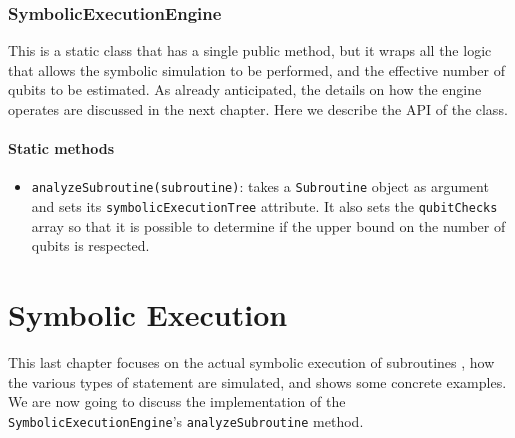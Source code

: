 \documentclass[12pt,a4paper]{report}
\theoremstyle{definition}
\theoremstyle{definition}
\theoremstyle{definition}
\begin{document}
\subsection{SymbolicExecutionEngine}
This is a static class that has a single public method, but it wraps all the logic that allows the symbolic simulation to be performed, and the effective number of qubits to be estimated. As already anticipated, the details on how the engine operates are discussed in the next chapter. Here we describe the API of the class.
\subsubsection{Static methods}
\begin{itemize}
    \itemsep 0em
    \item \texttt{analyzeSubroutine(subroutine)}: takes a \texttt{Subroutine} object as argument and sets its \texttt{symbolicExecutionTree} attribute. It also sets the \texttt{qubitChecks} array so that it is possible to determine if the upper bound on the number of qubits is respected.
\end{itemize}


\chapter{Symbolic Execution}
This last chapter focuses on the actual symbolic execution of subroutines \cite{SurveySymExec-CSUR18}, how the various types of statement are simulated, and shows some concrete examples.\\
We are now going to discuss the implementation of the \texttt{SymbolicExecutionEngine}'s \texttt{analyzeSubroutine} method.\\
\end{document}
